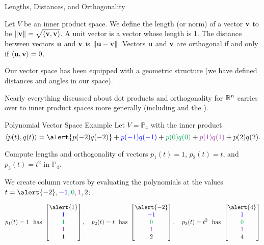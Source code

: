 \documentclass[xcolor=dvipsnames,aspectratio=169,t]{beamer}
\begin{document}
\begin{frame}{Lengths, Distances, and Orthogonality}

  \begin{definition}
    Let $V$ be an inner product space.  \smallskip
    \bi
    \ii We define the \alert{length} (or \alert{norm}) of a vector $\mathbf{v}$ to be $\| \mathbf{v} \| = \sqrt{\langle \mathbf{v} , \mathbf{v} \rangle}$. 
        \smallskip
    \ii A \alert{unit vector} is a vector whose length is 1. \smallskip
    \ii The \alert{distance between vectors} $\mathbf{u}$ and $\mathbf{v}$ is $\| \mathbf{u} - \mathbf{v} \|$.  \smallskip
    \ii Vectors $\mathbf{u}$ and $\mathbf{v}$ are \alert{orthogonal} if and only if $\langle \mathbf{u} , \mathbf{v} \rangle =0$.  \smallskip
    \ei
  \end{definition}
  \medskip

  Our vector space has been equipped with a \alert{geometric} structure (we have defined distances and angles in our space).
  \medskip
  
  Nearly everything discussed about dot products and orthogonality for $\mathbb{R}^n$ carries over to inner product spaces more generally (including  and the ).
\end{frame}


\begin{frame}{Polynomial Vector Space Example}
  Let $V = \mathbb{P}_4$ with the inner product 
  \[ \langle p(t) , q(t) \rangle = \alert{p(-2)q(-2)} + \colorb{p(-1)q(-1)} + \colorg{p(0)q(0)}+\colorp{p(1)q(1)}+p(2)q(2) .\]

  Compute lengths and orthogonality of vectors $p_1(t) =1$, $p_2(t) = t$, and $p_3(t) = t^2$ in  $\mathbb{P}_4$.
  \bigskip
  
  \pause
  We create column vectors by evaluating the polynomials at the values $t=\alert{-2}, \colorb{-1},  \colorg{0} , \colorp{1}, 2$:

  \[ p_1(t)=1 \mbox{\ \ has } \begin{bmatrix} \alert{1} \\ \colorb{1} \\ \colorg{1} \\ \colorp{1} \\ 1 \end{bmatrix}, \quad 
  p_2(t)=t \mbox{\ \ has } \begin{bmatrix} \alert{-2} \\ \colorb{-1} \\ \colorg{0} \\ \colorp{1} \\ 2 \end{bmatrix}, \quad
  p_3(t)=t^2 \mbox{\ \ has } \begin{bmatrix} \alert{4} \\ \colorb{1} \\ \colorg{0} \\ \colorp{1} \\ 4 \end{bmatrix} \]
\end{frame}
\end{document}
